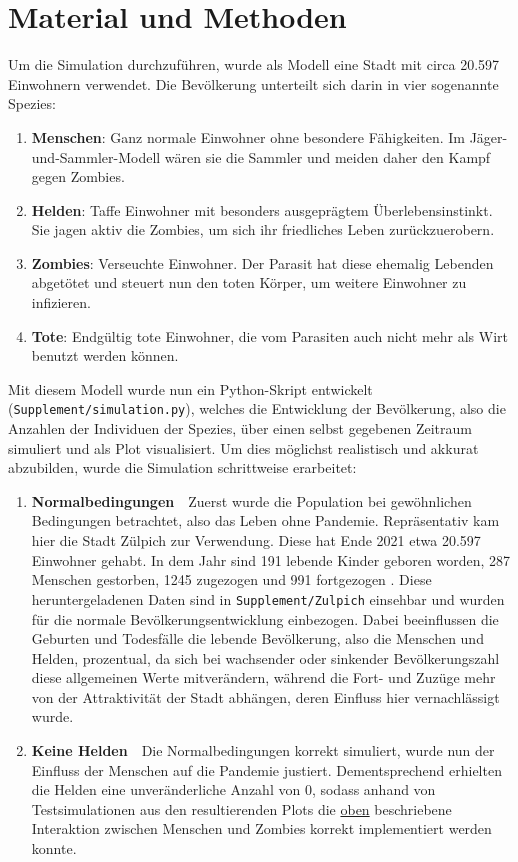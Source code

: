 \section{Material und Methoden} %
    \label{sec:material_und_methoden}
    Um die Simulation durchzuführen, wurde als Modell eine Stadt mit circa 20.597 Einwohnern verwendet. Die Bevölkerung unterteilt sich darin in vier sogenannte Spezies:
    \begin{enumerate}[1.]
        \item \textbf{Menschen}: Ganz normale Einwohner ohne besondere Fähigkeiten. Im Jäger-und-Sammler-Modell wären sie die Sammler und meiden daher den Kampf gegen Zombies.\label{species}
        \item \textbf{Helden}: Taffe Einwohner mit besonders ausgeprägtem Überlebensinstinkt. Sie jagen aktiv die Zombies, um sich ihr friedliches Leben zurückzuerobern.
        \item \textbf{Zombies}: Verseuchte Einwohner. Der Parasit hat diese ehemalig Lebenden abgetötet und steuert nun den toten Körper, um weitere Einwohner zu infizieren.
        \item \textbf{Tote}: Endgültig tote Einwohner, die vom Parasiten auch nicht mehr als Wirt benutzt werden können.
    \end{enumerate}
    Mit diesem Modell wurde nun ein Python-Skript entwickelt (\texttt{Supplement/simulation.py}), welches die Entwicklung der Bevölkerung, also die Anzahlen der Individuen der Spezies, über einen selbst gegebenen Zeitraum simuliert und als Plot visualisiert. Um dies möglichst realistisch und akkurat abzubilden, wurde die Simulation schrittweise erarbeitet:
    \begin{enumerate}[1.]
        \item \textbf{Normalbedingungen}\ \ Zuerst wurde die Population bei gewöhnlichen Bedingungen betrachtet, also das Leben ohne Pandemie. Repräsentativ kam hier die Stadt Zülpich zur Verwendung. Diese hat Ende 2021 etwa 20.597 Einwohner gehabt. In dem Jahr sind 191 lebende Kinder geboren worden, 287 Menschen gestorben, 1245 zugezogen und 991 fortgezogen \cite{zulpich}. Diese heruntergeladenen Daten sind in \texttt{Supplement/Zulpich} einsehbar und wurden für die normale Bevölkerungsentwicklung einbezogen. Dabei beeinflussen die Geburten und Todesfälle die lebende Bevölkerung, also die Menschen und Helden, prozentual, da sich bei wachsender oder sinkender Bevölkerungszahl diese allgemeinen Werte mitverändern, während die Fort- und Zuzüge mehr von der Attraktivität der Stadt abhängen, deren Einfluss hier vernachlässigt wurde.
        \item \textbf{Keine Helden}\ \ Die Normalbedingungen korrekt simuliert, wurde nun der Einfluss der Menschen auf die Pandemie justiert. Dementsprechend erhielten die Helden eine unveränderliche Anzahl von 0, sodass anhand von Testsimulationen aus den resultierenden Plots die \hyperref[species]{oben} beschriebene Interaktion zwischen Menschen und Zombies korrekt implementiert werden konnte.
    \end{enumerate}

